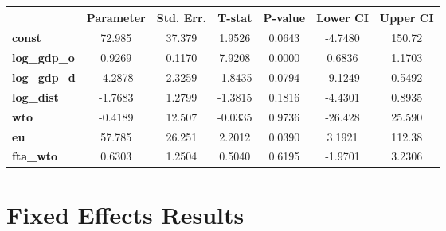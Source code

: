 \documentclass{article}
\begin{document}
\begin{center}
\begin{tabular}{lclc}
\end{tabular}
\begin{tabular}{lcccccc}
                     & \textbf{Parameter} & \textbf{Std. Err.} & \textbf{T-stat} & \textbf{P-value} & \textbf{Lower CI} & \textbf{Upper CI}  \\
\midrule
\textbf{const}       &       72.985       &       37.379       &      1.9526     &      0.0643      &      -4.7480      &       150.72       \\
\textbf{log\_gdp\_o} &       0.9269       &       0.1170       &      7.9208     &      0.0000      &       0.6836      &       1.1703       \\
\textbf{log\_gdp\_d} &      -4.2878       &       2.3259       &     -1.8435     &      0.0794      &      -9.1249      &       0.5492       \\
\textbf{log\_dist}   &      -1.7683       &       1.2799       &     -1.3815     &      0.1816      &      -4.4301      &       0.8935       \\
\textbf{wto}         &      -0.4189       &       12.507       &     -0.0335     &      0.9736      &      -26.428      &       25.590       \\
\textbf{eu}          &       57.785       &       26.251       &      2.2012     &      0.0390      &       3.1921      &       112.38       \\
\textbf{fta\_wto}    &       0.6303       &       1.2504       &      0.5040     &      0.6195      &      -1.9701      &       3.2306       \\
\bottomrule
\end{tabular}
\end{center}\section*{Fixed Effects Results}
\end{document}
